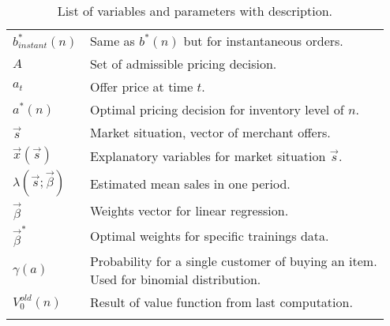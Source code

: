 \begin{longtable}{ll}
		$b^*_{instant}(n)$ & Same as $b^*(n)$ but for instantaneous orders. \\
		$A$ & Set of admissible pricing decision. \\
		$a_t$ & Offer price at time $t$. \\
		$a^*(n)$ & Optimal pricing decision for inventory level of $n$. \\
		$\vec{s}$ & Market situation, vector of merchant offers. \\
		$\vec{x}(\vec{s})$ & Explanatory variables for market situation $\vec{s}$. \\
		$\lambda(\vec{s}; \vec{\beta})$ & Estimated mean sales in one period. \\
		$\vec{\beta}$ & Weights vector for linear regression. \\
		$\vec{\beta}^*$ & Optimal weights for specific trainings data. \\
		$\gamma(a)$ & \makecell[l]{Probability for a single customer of buying an item. \\ Used for binomial distribution.} \\
		$V_0^{old}(n)$ & Result of value function from last computation. \\
		\bottomrule
	\caption[List of Variables and Parameters]{List of variables and parameters with description.}
	\label{tab:notations}
\end{longtable}
